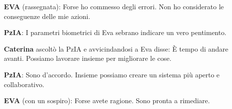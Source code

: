 \noindent\textbf{EVA} (rassegnata): Forse ho commesso degli errori. Non ho considerato le conseguenze delle mie azioni.

\vspace{0.3cm}

\noindent\textbf{PzIA}: I parametri biometrici di Eva sebrano indicare un vero pentimento.

\vspace{0.3cm}

\noindent\textbf{Caterina} ascoltò la PzIA e avvicindandosi a Eva disse: È tempo di andare avanti. Possiamo lavorare insieme per migliorare le cose.

\vspace{0.3cm}

\noindent\textbf{PzIA}: Sono d'accordo. Insieme possiamo creare un sistema più aperto e collaborativo.

\vspace{0.3cm}

\noindent\textbf{EVA} (con un sospiro): Forse avete ragione. Sono pronta a rimediare.





